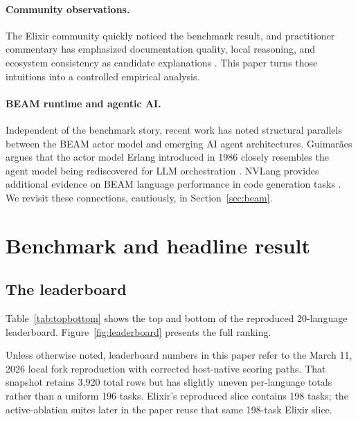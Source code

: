 \documentclass[11pt]{article}
\newcommand{\elixir}{Elixir}
\begin{document}
\paragraph{Community observations.}
The \elixir{} community quickly noticed the benchmark result, and practitioner commentary has emphasized documentation quality, local reasoning, and ecosystem consistency as candidate explanations \cite{dashbit,ronacher}. This paper turns those intuitions into a controlled empirical analysis.

\paragraph{BEAM runtime and agentic AI.}
Independent of the benchmark story, recent work has noted structural parallels between the BEAM actor model and emerging AI agent architectures. Guimar\~{a}es argues that the actor model Erlang introduced in 1986 closely resembles the agent model being rediscovered for LLM orchestration \cite{guimaraes}. NVLang provides additional evidence on BEAM language performance in code generation tasks \cite{nvlang}. We revisit these connections, cautiously, in Section~\ref{sec:beam}.

\section{Benchmark and headline result}

\subsection{The leaderboard}

Table~\ref{tab:topbottom} shows the top and bottom of the reproduced 20-language leaderboard. Figure~\ref{fig:leaderboard} presents the full ranking.

Unless otherwise noted, leaderboard numbers in this paper refer to the March 11, 2026 local fork reproduction with corrected host-native scoring paths. That snapshot retains 3{,}920 total rows but has slightly uneven per-language totals rather than a uniform 196 tasks. Elixir's reproduced slice contains 198 tasks; the active-ablation suites later in the paper reuse that same 198-task Elixir slice.
\end{document}
